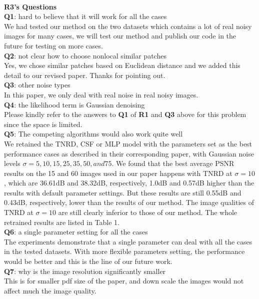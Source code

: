 \documentclass[10pt,twocolumn,letterpaper]{article}
\begin{document}
\\
\textbf{R3's Questions}
\\
\textbf{Q1}: hard to believe that it will work for all the cases
\\
We had tested our method on the two datasets which contains a lot of real noisy images for many cases, we will test our method and publish our code in the future for testing on more cases.
\\
\textbf{Q2}: not clear how to choose nonlocal similar patches
\\
Yes, we chose similar patches based on Euclidean distance and we added this detail to our revised paper. Thanks for pointing out.
\\
\textbf{Q3}: other noise types
\\
In this paper, we only deal with real noise in real noisy images.
\\
\textbf{Q4}: the likelihood term is Gaussian denoising
\\
Please kindly refer to the answers to \textbf{Q1} of \textbf{R1} and \textbf{Q3} above for this problem since the space is limited. 
\\
\textbf{Q5}: The competing algorithms would also work quite well
\\
We retained the TNRD, CSF or MLP model with the parameters set as the best performance cases as described in their corresponding paper, with Gaussian noise levels $\sigma = 5, 10, 15, 25, 35, 50, and 75$. We found that the best average PSNR results on the 15 and 60 images used in our paper happens with TNRD at $\sigma = 10$, which are 36.61dB and 38.32dB, respectively, 1.0dB and 0.57dB higher than the results with default parameter settings. But these results are still 0.55dB and 0.43dB, respectively, lower than the results of our method. The image qualities of TNRD at $\sigma = 10$ are still clearly inferior to those of our method. The whole retrained results are listed in Table 1.
\\
\textbf{Q6}: a single parameter setting for all the cases 
\\
The experiments demonstrate that a single parameter can deal with all the cases in the tested datasets. With more flexible parameters setting, the performance would be better and this is the line of our future work.
\\
\textbf{Q7}: why is the image resolution significantly smaller
\\
This is for smaller pdf size of the paper, and down scale the images would not affect much the image quality.



{\small


}
\end{document}
